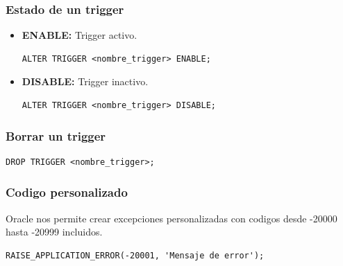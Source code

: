 \documentclass{templateNote}
\begin{document}
\subsubsection{Estado de un trigger}
\begin{itemize}
    \item \textbf{ENABLE:} Trigger activo.
    \begin{tcolorbox}[
        colframe=Verde!100, %
        colback=Verde!20,       %
        coltitle=white!100, %
        title=\textbf{PL/SQL}, %
    ]
        \begin{verbatim}
ALTER TRIGGER <nombre_trigger> ENABLE;
        \end{verbatim}
    \end{tcolorbox}

    \item \textbf{DISABLE:} Trigger inactivo.
    \begin{tcolorbox}[
        colframe=red!90!black, %
        colback=red!20,       %
        coltitle=white!100, %
        title=\textbf{PL/SQL}, %
    ]
        \begin{verbatim}
ALTER TRIGGER <nombre_trigger> DISABLE;
        \end{verbatim}
    \end{tcolorbox}
\end{itemize}

\subsubsection{Borrar un trigger}
\begin{tcolorbox}[
    colframe=red!90!black, %
    colback=red!20,       %
    coltitle=white!100, %
    title=\textbf{PL/SQL}, %
]
    \begin{verbatim}
DROP TRIGGER <nombre_trigger>;
    \end{verbatim}
\end{tcolorbox}

\subsubsection{Codigo personalizado}
Oracle nos permite crear excepciones personalizadas con codigos desde -20000 hasta -20999 incluidos.
\begin{tcolorbox}[
    colframe=Celeste!100, %
    colback=Celeste!20,       %
    coltitle=black!100, %
    title=\textbf{PL/SQL}, %
]
    \begin{verbatim}
RAISE_APPLICATION_ERROR(-20001, 'Mensaje de error');
    \end{verbatim}
\end{tcolorbox}
\newpage
\end{document}
